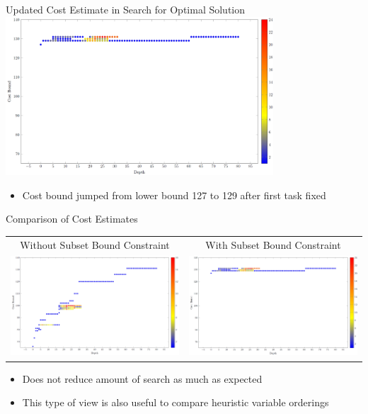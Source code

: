\begin{frame}{Updated Cost Estimate in Search for Optimal Solution}
\includegraphics[width=10cm]{images/flowdepthcountrun29pushed.PNG}
\begin{itemize}
    \item Cost bound jumped from lower bound 127 to 129 after first task fixed
\end{itemize}
\end{frame}

\begin{frame}{Comparison of Cost Estimates}
\begin{tabular}{cc}
\scriptsize Without Subset Bound Constraint & \scriptsize With Subset Bound Constraint\\
\includegraphics[width=6.5cm]{images/flowdepthcountrun29.PNG}
&
\includegraphics[width=6.5cm]{images/flowdepthcountrun29pushed.PNG}
\end{tabular}
\begin{itemize}
    \item Does not reduce amount of search as much as expected
    \item This type of view is also useful to compare heuristic variable orderings
\end{itemize}
\end{frame}

